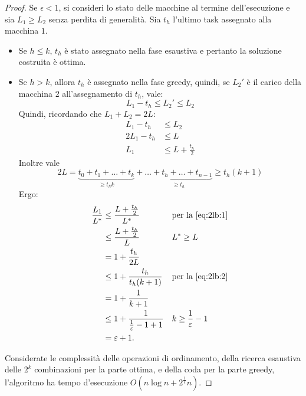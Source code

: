 \begin{proof}
	Se $\epsilon<1$, si consideri lo stato delle macchine al termine dell'esecuzione e sia $L_1\geq L_2$ senza perdita di generalità.
	Sia $t_h$ l'ultimo task assegnato alla macchina $1$.
	\begin{itemize}
		\item Se $h\leq k$, $t_h$ è stato assegnato nella fase esaustiva e pertanto la soluzione costruita è ottima.
		\item Se $h>k$, allora $t_h$ è assegnato nella fase greedy, quindi, se $L_2'$ è il carico della macchina $2$ all'assegnamento di $t_h$, vale:
		      \begin{equation*}
			      L_1-t_h\leq L_2'\leq L_2
		      \end{equation*}
		      Quindi, ricordando che $L_1+L_2=2L$:
		      \begin{align}
			      L_1-t_h  & \leq L_2 \nonumber                    \\
			      2L_1-t_h & \leq L \nonumber                      \\
			      L_1      & \leq L+\frac{t_h}{2} \label{eq:2lb:1}
		      \end{align}
		      Inoltre vale
		      \begin{equation}\label{eq:2lb:2}
			      2L = \underbrace{t_0+t_1+\dots+t_k}_{\geq t_hk}+\underbrace{\dots+t_h+\dots+t_{n-1}}_{\geq t_h} \geq t_h(k+1)
		      \end{equation}
		      Ergo:
		      \begin{align*}
			      \frac{L_1}{L\star} & \leq \frac{L+\frac{t_h}{2}}{L\star}        &  & \text{per la \ref{eq:2lb:1}} \\
			                         & \leq \frac{L+\frac{t_h}{2}}{L}             &  & L\star\geq L                 \\
			                         & = 1+\frac{t_h}{2L}                                                           \\
			                         & \leq 1+\frac{t_h}{t_h(k+1)}                &  & \text{per la \ref{eq:2lb:2}} \\
			                         & = 1+\frac{1}{k+1}                                                            \\
			                         & \leq 1+\frac{1}{\frac{1}{\epsilon}-1+1} &  & k\geq\frac{1}{\epsilon}-1 \\
			                         & = \epsilon+1 \text.
		      \end{align*}
	\end{itemize}
	Considerate le complessità delle operazioni di ordinamento, della ricerca esaustiva delle $2^k$ combinazioni per la parte ottima, e della coda per la parte greedy, l'algoritmo ha tempo d'esecuzione $O(n\log n+2^{\frac{1}{\epsilon}}n)$.
\end{proof}



